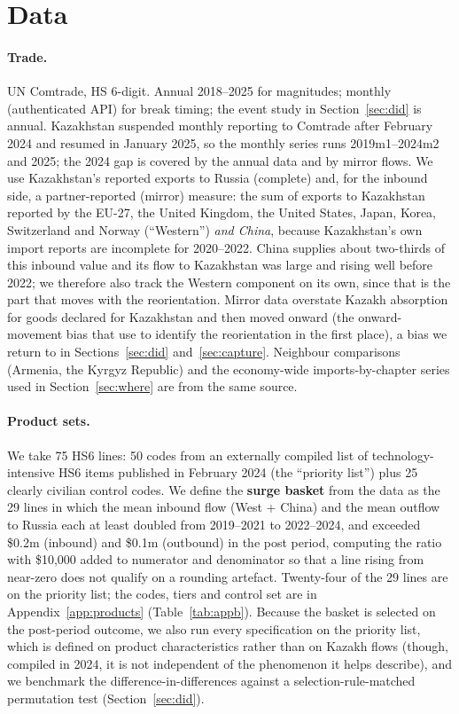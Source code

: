 \documentclass[12pt]{article}
\begin{document}
\section{Data}\label{sec:data}

\paragraph{Trade.} UN Comtrade, HS 6-digit. Annual 2018--2025 for magnitudes; monthly
(authenticated API) for break timing; the event study in Section~\ref{sec:did} is annual. Kazakhstan suspended monthly
reporting to Comtrade after February 2024 and resumed in January 2025, so the monthly series
runs 2019m1--2024m2 and 2025; the 2024 gap is covered by the annual data and by mirror flows.
We use Kazakhstan's reported exports to Russia (complete) and, for the inbound side, a
partner-reported (mirror) measure:
the sum of exports to Kazakhstan reported by the EU-27, the United Kingdom, the United States,
Japan, Korea, Switzerland and Norway (``Western'') \emph{and China}, because Kazakhstan's own
import reports are incomplete for 2020--2022. China supplies about two-thirds of this inbound
value and its flow to Kazakhstan was large and rising well before 2022; we therefore also
track the Western component on its own, since that is the part that moves with the
reorientation. Mirror data overstate Kazakh absorption for goods declared for Kazakhstan and
then moved onward (the onward-movement bias that \citet{chupilkin2026roundabout} use to
identify the reorientation in the first place), a bias we return to in
Sections~\ref{sec:did} and~\ref{sec:capture}. Neighbour comparisons (Armenia, the Kyrgyz Republic) and the
economy-wide imports-by-chapter series used in Section~\ref{sec:where} are from the same
source.

\paragraph{Product sets.} We take 75 HS6 lines: 50 codes from an externally compiled list of
technology-intensive HS6 items published in February 2024 (the ``priority list'') plus 25
clearly civilian control codes. We define the \textbf{surge basket} from the data as the 29
lines in which the mean inbound flow (West + China) and the mean outflow to Russia each at
least doubled from 2019--2021 to 2022--2024, and exceeded \$0.2m (inbound) and \$0.1m
(outbound) in the post period, computing the ratio with \$10{,}000 added to numerator and
denominator so that a line rising from near-zero does not qualify on a rounding artefact.
Twenty-four of the 29 lines are on the priority list; the codes, tiers and control set are in
Appendix~\ref{app:products} (Table~\ref{tab:appb}). Because the basket is selected on the
post-period outcome, we also run every specification on the priority list, which is defined on
product characteristics rather than on Kazakh flows (though, compiled in 2024, it is not
independent of the phenomenon it helps describe), and we benchmark the difference-in-differences
against a selection-rule-matched permutation test (Section~\ref{sec:did}).
\end{document}
